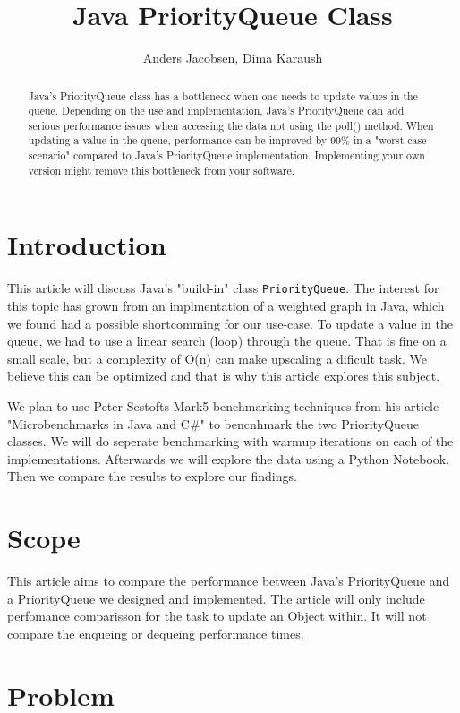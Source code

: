 \documentclass{article}
\title{Java PriorityQueue Class}
\author{Anders Jacobsen, Dima Karaush}
\begin{document}
\maketitle

\begin{abstract}
    Java's PriorityQueue class has a bottleneck when one needs to update values in the queue.
    Depending on the use and implementation, Java's PriorityQueue can add serious performance 
    issues when accessing the data not using the poll() method.
    When updating a value in the queue, performance can be improved by 99\% in a "worst-case-scenario" compared 
    to Java's PriorityQueue implementation. Implementing your own version might remove this 
    bottleneck from your software. 
\end{abstract}

\section{Introduction}
This article will discuss Java's "build-in" class \lstinline!PriorityQueue!. 
The interest for this topic has grown from an implmentation of a weighted graph 
in Java, which we found had a possible shortcomming for our use-case. To update
a value in the queue, we had to use a linear search (loop) through the queue. 
That is fine on a small scale, but a complexity of O(n) can make upscaling a dificult task. 
We believe this can be optimized and that is why this article explores this subject.  

We plan to use Peter Sestofts Mark5 benchmarking techniques from his article 
"Microbenchmarks in Java and C\#" \cite{microbenchmarks} to bencnhmark the two 
PriorityQueue classes. We will do seperate benchmarking with warmup iterations on 
each of the implementations. Afterwards we will explore the data using a Python
Notebook. Then we compare the results to explore our findings. 


\section{Scope}
This article aims to compare the performance between Java's PriorityQueue
and a PriorityQueue we designed and implemented. The article will only include 
perfomance comparisson for the task to update an Object within. It will not 
compare the enqueing or dequeing performance times.

\section{Problem}
\end{document}
